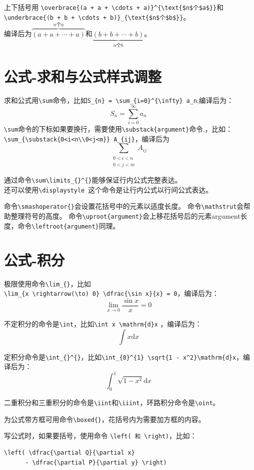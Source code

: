 \documentclass[12pt,a4paper]{ctexart}
\begin{document}
上下括号用 \verb|\overbrace{(a + a + \cdots + a)}^{\text{$n$个$a$}}|和\\
\verb|\underbrace{(b + b + \cdots + b)}_{\text{$n$个$b$}}|。\\
编译后为$\overbrace{(a + a + \cdots + a)}^{\text{$n$个$a$}}$和$\underbrace{(b + b + \cdots + b)}_{\text{$n$个$b$}}$。


\section{公式-求和与公式样式调整}
求和公式用\verb|\sum|命令，比如\verb|S_{n} = \sum_{i=0}^{\infty} a_n|,编译后为：
\[
  S_{n} = \sum_{i=0}^{\infty} a_n
\]
\verb|\sum|命令的下标如果要换行，需要使用\verb|\substack{argument}|命令,，比如：\\
\verb|\sum_{\substack{0<i<n\\0<j<m}} A_{ij}|，编译后为
\[
\sum_{\substack{0<i<n\\0<j<m}} A_{ij}
\]

通过命令\verb|\sum\limits_{}^{}|能够保证行内公式完整表达。\\
还可以使用\verb|\displaystyle |这个命令是让行内公式以行间公式表达。

命令\verb|\smashoperator{}|会设置花括号中的元素以适度长度。
命令\verb|\mathstrut|会帮助整理符号的高度。
命令\verb|\uproot{argument}|会上移花括号后的元素argument长度，命令\verb|\leftroot{argument}|同理。

\section{公式-积分}
极限使用命令\verb|\lim_{}|，比如\\
\verb|\lim_{x \rightarrow(\to) 0} \dfrac{\sin x}{x} = 0|，编译后为：
\[
  \lim_{x \rightarrow 0} \dfrac{\sin x}{x} = 0
\]

不定积分的命令是\verb|\int|，比如\verb|\int x \mathrm{d}x|
，编译后为：
\[
\int x \mathrm{d}x
\]

定积分命令是\verb|\int_{}^{}|，比如\verb|\int_{0}^{1} \sqrt{1 - x^2}\mathrm{d}x|，编译后为：
\[
  \int_{0}^{1} \sqrt{1 - x^2}\mathrm{d}x
\]

二重积分和三重积分的命令是\verb|\iint|和\verb|\iiint|，环路积分命令是\verb|\oint|。

为公式带方框可用命令\verb|\boxed{}|，花括号内为需要加方框的内容。

写公式时，如果要括号，使用命令 \verb|\left( 和 \right)|，比如：

\begin{verbatim}
\left( \dfrac{\partial Q}{\partial x}
      - \dfrac{\partial P}{\partial y} \right)
\end{verbatim}
\end{document}
